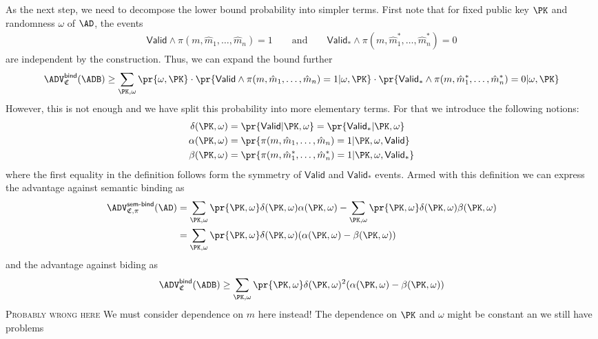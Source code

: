 \documentclass{crypto-exercise}
\newcommand{\CS}{\mathfrak{C}}
\newcommand{\advSEMBINDXX}[2]{\ADV_{#1}^{\mathsf{sem\text{-}bind}}(#2)}
\newcommand{\VALID}{\mathsf{Valid}}
\begin{document}
\begin{solution}
As the next step, we need to decompose the lower bound probability into simpler terms. First note that for fixed public key $\PK$ and randomness $\omega$ of $\AD$, the events
\begin{align*}
 \VALID\wedge \pi(m,\hat{m}_1,\ldots,\hat{m}_n)=1\qquad\text{and}\qquad
 \VALID_*\wedge \pi(m,\hat{m}^*_1,\ldots,\hat{m}^*_n)=0
\end{align*}
are independent by the construction. Thus, we can expand the bound further
\begin{align*}
\advBindXX{\CS}{\ADB}\geq\sum_{\PK,\omega}\pr{\omega,\PK}\cdot\pr{\VALID\wedge \pi(m,\hat{m}_1,\ldots,\hat{m}_n)=1|\omega,\PK}\cdot\pr{\VALID_*\wedge \pi(m,\hat{m}^*_1,\ldots,\hat{m}^*_n)=0|\omega,\PK}
\end{align*}
However, this is not enough and we have split this probability into more elementary terms. For that we introduce the following notions:
\begin{align*}
\delta(\PK,\omega)&=\pr{\VALID|\PK,\omega}=\pr{\VALID_*|\PK,\omega}\\
\alpha(\PK,\omega)&=\pr{\pi(m,\hat{m}_1,\ldots,\hat{m}_n)=1|\PK,\omega,\VALID}\\
\beta(\PK,\omega)&=\pr{\pi(m,\hat{m}^*_1,\ldots,\hat{m}^*_n)=1|\PK,\omega,\VALID_*}
\end{align*}   
where the first equality in the definition follows form the symmetry of $\VALID$ and $\VALID_*$ events. Armed with this definition we can express  the advantage against semantic binding as
\begin{align*}
\advSEMBINDXX{\CS,\pi}{\AD}&=\sum_{\PK,\omega}\pr{\PK,\omega}\delta(\PK,\omega)\alpha(\PK,\omega)- \sum_{\PK,\omega}\pr{\PK,\omega}\delta(\PK,\omega)\beta(\PK,\omega)\\
&=\sum_{\PK,\omega}\pr{\PK,\omega}\delta(\PK,\omega)(\alpha(\PK,\omega)-\beta(\PK,\omega))
\end{align*}
and the advantage against biding as
\begin{align*}
\advBindXX{\CS}{\ADB}\geq\sum_{\PK,\omega}\pr{\PK,\omega}\delta(\PK,\omega)^2(\alpha(\PK,\omega)-\beta(\PK,\omega))
\end{align*}
\textsc{Probably wrong here}
We must consider dependence on $m$ here instead!
The dependence on $\PK$ and $\omega$ might be constant an we still have problems





 

 




\end{solution}
\end{document}
